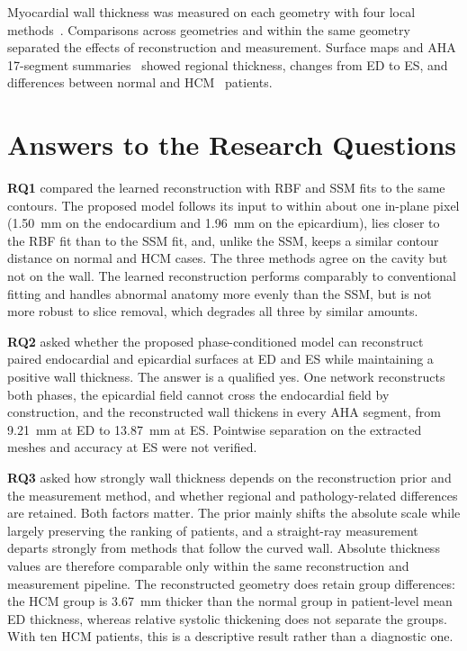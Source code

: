 Myocardial wall thickness was measured on each geometry with four local
methods~\parencite{saito1994edt,jones2000laplace,yezzi2003thickness,shapira2008sdf}.
Comparisons across geometries and within the same geometry separated the
effects of reconstruction and measurement. Surface maps and AHA
17-segment summaries~\parencite{cerqueira2002segmentation} showed regional
thickness, changes from ED to ES, and differences between normal and
HCM~\parencite{ommen2020hcm} patients.

\section{Answers to the Research Questions}
\label{sec:conclusion-research-questions}
\noindent
\textbf{RQ1} compared the learned reconstruction with RBF and SSM fits to the
same contours. The proposed model follows its input to within about one in-plane pixel
(1.50~mm on the endocardium and 1.96~mm on the epicardium), lies closer to
the RBF fit than to the SSM fit, and, unlike the SSM, keeps a similar contour
distance on normal and HCM cases. The three methods agree on the cavity but
not on the wall. The learned reconstruction performs comparably to conventional
fitting and handles abnormal anatomy more evenly than the SSM, but is not more
robust to slice removal, which degrades all three by similar amounts.

\textbf{RQ2} asked whether the proposed phase-conditioned model can reconstruct
paired endocardial and epicardial surfaces at ED and ES while maintaining a
positive wall thickness. The answer is a qualified yes. One network
reconstructs both phases, the epicardial field cannot cross the endocardial
field by construction, and the reconstructed wall thickens in every AHA
segment, from 9.21~mm at ED to 13.87~mm at ES. Pointwise separation on the
extracted meshes and accuracy at ES were not verified.

\textbf{RQ3} asked how strongly wall thickness depends on the reconstruction
prior and the measurement method, and whether regional and pathology-related
differences are retained. Both factors matter. The prior mainly shifts the
absolute scale while largely preserving the ranking of patients, and a
straight-ray measurement departs strongly from methods that follow the curved
wall. Absolute thickness values are therefore comparable only within the same
reconstruction and measurement pipeline. The reconstructed geometry does retain
group differences: the HCM group is 3.67~mm thicker than the normal group in
patient-level mean ED thickness, whereas relative systolic thickening does not
separate the groups. With ten HCM patients, this is a descriptive result rather
than a diagnostic one.

